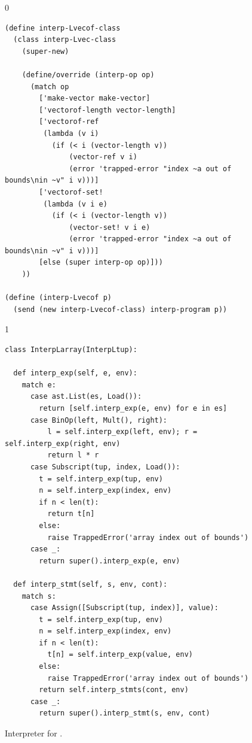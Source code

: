 \documentclass[7x10]{TimesAPriori_MIT}%
\def\racketEd{0}
\def\pythonEd{1}
\def\edition{1}
\newcommand{\pythonColor}[0]{}
\numberwithin{theorem}{chapter}
\numberwithin{definition}{chapter}
\numberwithin{equation}{chapter}
\begin{document}
\begin{figure}[tbp]
  \begin{tcolorbox}[colback=white]
{\if\edition\racketEd    
\begin{lstlisting}[basicstyle=\ttfamily\footnotesize]
(define interp-Lvecof-class
  (class interp-Lvec-class
    (super-new)

    (define/override (interp-op op)
      (match op
        ['make-vector make-vector]
        ['vectorof-length vector-length]
        ['vectorof-ref
         (lambda (v i)
           (if (< i (vector-length v))
               (vector-ref v i)
               (error 'trapped-error "index ~a out of bounds\nin ~v" i v)))]
        ['vectorof-set!
         (lambda (v i e)
           (if (< i (vector-length v))
               (vector-set! v i e)
               (error 'trapped-error "index ~a out of bounds\nin ~v" i v)))]
        [else (super interp-op op)]))
    ))

(define (interp-Lvecof p)
  (send (new interp-Lvecof-class) interp-program p))
\end{lstlisting}
    \fi}
{\if\edition\pythonEd\pythonColor
\begin{lstlisting}[basicstyle=\ttfamily\footnotesize]
class InterpLarray(InterpLtup):

  def interp_exp(self, e, env):
    match e:
      case ast.List(es, Load()):
        return [self.interp_exp(e, env) for e in es]
      case BinOp(left, Mult(), right):
          l = self.interp_exp(left, env); r = self.interp_exp(right, env)
          return l * r
      case Subscript(tup, index, Load()):
        t = self.interp_exp(tup, env)
        n = self.interp_exp(index, env)
        if n < len(t):
          return t[n]
        else:
          raise TrappedError('array index out of bounds')
      case _:
        return super().interp_exp(e, env)

  def interp_stmt(self, s, env, cont):
    match s:
      case Assign([Subscript(tup, index)], value):
        t = self.interp_exp(tup, env)
        n = self.interp_exp(index, env)
        if n < len(t):
          t[n] = self.interp_exp(value, env)
        else:
          raise TrappedError('array index out of bounds')
        return self.interp_stmts(cont, env)
      case _:
        return super().interp_stmt(s, env, cont)
\end{lstlisting}
\fi}
  \end{tcolorbox}

  \caption{Interpreter for \LangArray{}.}
\label{fig:interp-Lvecof}
\end{figure}
\end{document}
